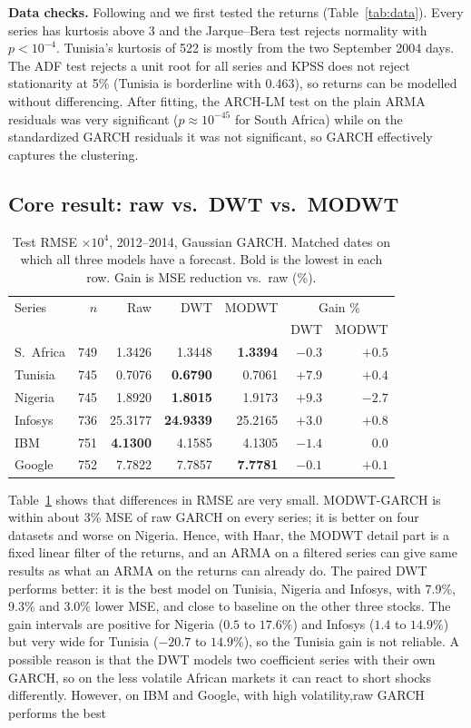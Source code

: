 \documentclass{article}
\begin{document}
\textbf{Data checks.} Following \citet{ismail2016} and \citet{rubio2023} we first tested the returns (Table~\ref{tab:data}). Every series has kurtosis above 3 and the Jarque--Bera test rejects normality with $p<10^{-4}$. Tunisia's kurtosis of 522 is mostly from the two September 2004 days. The ADF test rejects a unit root for all series and KPSS does not reject stationarity at 5\% (Tunisia is borderline with 0.463), so returns can be modelled without differencing. After fitting, the ARCH-LM test on the plain ARMA residuals was very significant ($p\approx10^{-45}$ for South Africa) while on the standardized GARCH residuals it was not significant, so GARCH effectively captures the clustering.

\subsection{Core result: raw vs.\ DWT vs.\ MODWT}

\begin{table}[t]
\caption{Test RMSE $\times10^4$, 2012--2014, Gaussian GARCH. Matched dates on which all three models have a forecast. Bold is the lowest in each row. Gain is MSE reduction vs.\ raw (\%).}
\label{tab:core}
\centering\small
\setlength{\tabcolsep}{3pt}
\begin{tabular}{lrrrrrr}
\toprule
Series & $n$ & Raw & DWT & MODWT & \multicolumn{2}{c}{Gain \%} \\
 & & & & & DWT & MODWT\\
\midrule
S.\ Africa & 749 & 1.3426 & 1.3448 & \textbf{1.3394} & $-0.3$ & $+0.5$\\
Tunisia & 745 & 0.7076 & \textbf{0.6790} & 0.7061 & $+7.9$ & $+0.4$\\
Nigeria & 745 & 1.8920 & \textbf{1.8015} & 1.9173 & $+9.3$ & $-2.7$\\
Infosys & 736 & 25.3177 & \textbf{24.9339} & 25.2165 & $+3.0$ & $+0.8$\\
IBM & 751 & \textbf{4.1300} & 4.1585 & 4.1305 & $-1.4$ & $0.0$\\
Google & 752 & 7.7822 & 7.7857 & \textbf{7.7781} & $-0.1$ & $+0.1$\\
\bottomrule
\end{tabular}
\end{table}

Table~\ref{tab:core} shows that differences in RMSE are very small. MODWT-GARCH is within about 3\% MSE of raw GARCH on every series; it is better on four datasets and worse on Nigeria. Hence, with Haar, the MODWT detail part is a fixed linear filter of the returns, and an ARMA on a filtered series can give same results as what an ARMA on the returns can already do. The paired DWT performs better: it is the best model on Tunisia, Nigeria and Infosys, with 7.9\%, 9.3\% and 3.0\% lower MSE, and close to baseline on the other three stocks. The gain intervals are positive for Nigeria ($0.5$ to $17.6\%$) and Infosys ($1.4$ to $14.9\%$) but very wide for Tunisia ($-20.7$ to $14.9\%$), so the Tunisia gain is not reliable. A possible reason is that the DWT models two coefficient series with their own GARCH, so on the less volatile African markets it can react to short shocks differently. However, on IBM and Google, with high volatility,raw GARCH performs the best
\end{document}
